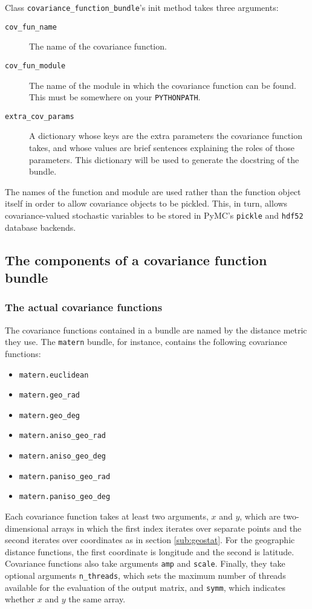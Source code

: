 \documentclass[]{manual}
\begin{document}
Class \texttt{covariance_function_bundle}'s init method takes three arguments:
\begin{description}
	\item[\texttt{cov_fun_name}] The name of the covariance function.
	\item[\texttt{cov_fun_module}] The name of the module in which the covariance function can be found. This must be somewhere on your \texttt{PYTHONPATH}.
	\item[\texttt{extra_cov_params}] A dictionary whose keys are the extra parameters the covariance function takes, and whose values are brief sentences explaining the roles of those parameters. This dictionary will be used to generate the docstring of the bundle.
\end{description}
The names of the function and module are used rather than the function object itself in order to allow covariance objects to be pickled. This, in turn, allows covariance-valued stochastic variables to be stored in PyMC's \texttt{pickle} and \texttt{hdf52} database backends.


\subsection{The components of a covariance function bundle}

\subsubsection{The actual covariance functions}\label{sub:distances}
The covariance functions contained in a bundle are named by the distance metric they use. The \texttt{matern} bundle, for instance, contains the following covariance functions:
\begin{itemize}
	\item \texttt{matern.euclidean}
	\item \texttt{matern.geo_rad}
	\item \texttt{matern.geo_deg}
	\item \texttt{matern.aniso_geo_rad}
	\item \texttt{matern.aniso_geo_deg}
	\item \texttt{matern.paniso_geo_rad}
	\item \texttt{matern.paniso_geo_deg}
\end{itemize}

Each covariance function takes at least two arguments, $x$ and $y$, which are two-dimensional arrays in which the first index iterates over separate points and the second iterates over coordinates as in section \ref{sub:geostat}. For the geographic distance functions, the first coordinate is longitude and the second is latitude. Covariance functions also take arguments \texttt{amp} and \texttt{scale}. Finally, they take optional arguments \texttt{n_threads}, which sets the maximum number of threads available for the evaluation of the output matrix, and \texttt{symm}, which indicates whether $x$ and $y$ the same array.
\end{document}
